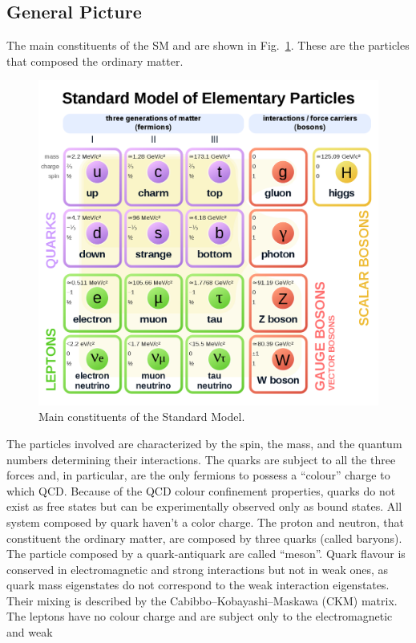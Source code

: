 \subsection*{General Picture}
The main constituents of the SM and  are shown in Fig.~\ref{SM}. These  are the particles that composed the ordinary matter.
\begin{figure}
\centering
\includegraphics[scale= 0.2]{../Cap1/SM}
\caption{Main constituents of the Standard Model.}
\label{SM}
\end{figure}
The particles involved are characterized by the spin, the mass, and the quantum numbers determining their interactions.
The quarks are subject to all the three forces and, in particular, are the only fermions to
possess a ``colour'' charge to which QCD. Because of the QCD colour confinement properties, quarks do not exist as free states
but can be experimentally observed only as bound states. All system composed by quark haven't a color charge. The proton and neutron, that constituent the ordinary matter, are composed by three quarks (called baryons). The particle composed by a quark-antiquark are called ``meson''. Quark flavour is conserved in electromagnetic and strong interactions but not in weak ones, as quark mass eigenstates do not correspond to the weak interaction eigenstates.
Their mixing is described by the Cabibbo–Kobayashi–Maskawa (CKM) matrix.
The leptons have no colour charge and are subject only to the electromagnetic and weak

